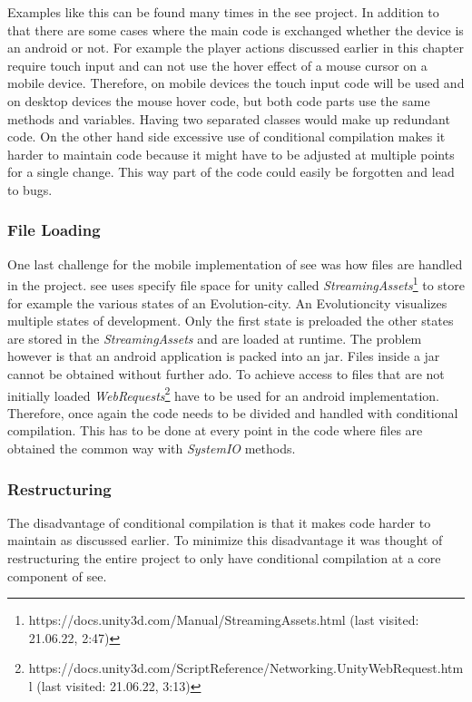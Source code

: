 Examples like this can be found many times in the \gls{see} project. 
In addition to that there are some cases where the main code is exchanged whether the device is an \gls{android} or not.
For example the player actions discussed earlier in this chapter require touch input and can not use the hover effect of a mouse cursor on a mobile device.
Therefore, on mobile devices the touch input code will be used and on desktop devices the mouse hover code, but both code parts use the same methods and variables.
Having two separated classes would make up redundant code. 
On the other hand side excessive use of conditional compilation makes it harder to maintain code because it might have to be adjusted at multiple points for a single change.
This way part of the code could easily be forgotten and lead to bugs.

\subsubsection{File Loading}
One last challenge for the mobile implementation of \gls{see} was how files are handled in the project.
\gls{see} uses specify file space for \gls{unity} called \textit{StreamingAssets}\footnote{https://docs.unity3d.com/Manual/StreamingAssets.html (last visited: 21.06.22, 2:47)} to store for example the various states of an Evolution-\gls{city}.
An Evolution\gls{city} visualizes multiple states of development.
Only the first state is preloaded the other states are stored in the \textit{StreamingAssets} and are loaded at runtime. 
The problem however is that an \gls{android} application is packed into an \gls{jar}.
Files inside a \gls{jar} cannot be obtained without further ado.
To achieve access to files that are not initially loaded \textit{WebRequests}\footnote{https://docs.unity3d.com/ScriptReference/Networking.UnityWebRequest.html (last visited: 21.06.22, 3:13)} have to be used for an \gls{android} implementation. 
Therefore, once again the code needs to be divided and handled with conditional compilation.
This has to be done at every point in the code where files are obtained the common way with \textit{SystemIO} methods. 


\subsubsection{Restructuring}
The disadvantage of conditional compilation is that it makes code harder to maintain as discussed earlier.
To minimize this disadvantage it was thought of restructuring the entire project to only have conditional compilation at a core component of \gls{see}.

